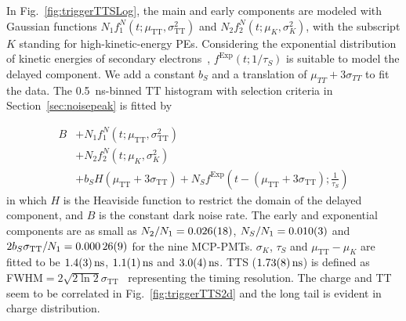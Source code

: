 In Fig.~\ref{fig:triggerTTSLog}, the main and early components are modeled with Gaussian functions %
$N_1f_1^N(t;\mu_{\mathrm{TT}},\sigma_{\mathrm{TT}}^2)$ and $N_2f_2^N(t;\mu_K,\sigma_K^2)$, with the subscript $K$ standing for high-kinetic-energy PEs. Considering the exponential distribution of kinetic energies of secondary electrons~\cite{Furman,SecondElectron}, $f^\mathrm{Exp}(t;1/\tau_S)$ is suitable to model the delayed component.  We add a constant $b_S$ and a translation of $\mu_{TT} + 3\sigma_{TT}$ to fit the data. The \SI{0.5}{ns}-binned $\mathrm{TT}$ histogram with selection criteria in Section~\ref{sec:noisepeak} is fitted by

\begin{equation}
    \begin{aligned}
        B&+N_1f_1^N(t;\mu_{\mathrm{TT}},\sigma_{\mathrm{TT}}^2)\\
        &+N_2f_2^N(t;\mu_K,\sigma_K^2)\\
        &+b_SH(\mu_{\mathrm{TT}}+3\sigma_{\mathrm{TT}})+N_Sf^{\mathrm{Exp}}\left(t-(\mu_{\mathrm{TT}}+3\sigma_{\mathrm{TT}});\frac{1}{\tau_S}\right)
    \end{aligned}
\end{equation}
in which $H$ is the Heaviside function to restrict the domain of the delayed component, and $B$ is the constant dark noise rate. The early and exponential components are as small as $N_2/N_1 = \num{0.026\pm0.018}$, $N_S/N_1 = \num{0.010\pm0.003}$ and $2b_S\sigma_{\mathrm{TT}}/N_1 = \num{0.00026\pm0.00009}$ for the nine MCP-PMTs.  $\sigma_K$, $\tau_S$ and $\mu_{\mathrm{TT}}-\mu_K$ are fitted to be $\SI{1.4 \pm 0.3}{ns}$, $\SI{1.1\pm 0.1}{ns}$ and $\SI{3.0\pm 0.4}{ns}$. TTS ($\SI{1.73\pm0.08}{ns}$) is defined as FWHM$=2\sqrt{2\ln 2}\sigma_{\mathrm{TT}}$~\cite{HAMAMATSUManual} representing the timing resolution. The charge and TT seem to be correlated in Fig.~\ref{fig:triggerTTS2d} and the long tail is evident in charge distribution.

